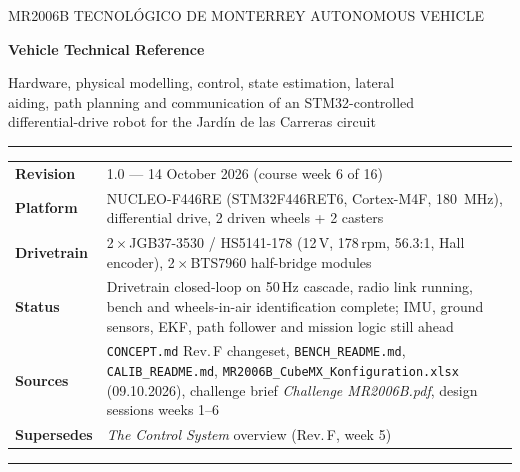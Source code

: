 \documentclass[11pt,a4paper]{article}
\newcommand{\code}[1]{\texttt{\small #1}}
\begin{document}
\begin{titlepage}
\vspace*{22mm}
{\footnotesize\ttfamily\color{accent}MR2006B \textperiodcentered{} TECNOL\'OGICO DE MONTERREY \textperiodcentered{} AUTONOMOUS VEHICLE\par}
\vspace{5mm}
{\fontsize{30}{36}\selectfont\bfseries\sffamily Vehicle Technical Reference\par}
\vspace{5mm}
{\large\color{grey}Hardware, physical modelling, control, state estimation, lateral\\
aiding, path planning and communication of an STM32-controlled\\
differential-drive robot for the Jard\'in de las Carreras circuit\par}
\vspace{14mm}
{\color{rule}\rule{\textwidth}{0.4pt}}
\vspace{2mm}

\begin{tabularx}{\textwidth}{@{}>{\bfseries\sffamily\small}lL@{}}
Revision     & 1.0 --- 14 October 2026 (course week 6 of 16)\\
Platform     & NUCLEO-F446RE (STM32F446RET6, Cortex-M4F, \qty{180}{\mega\hertz}),
               differential drive, 2 driven wheels + 2 casters\\
Drivetrain   & 2\,$\times$\,JGB37-3530 / HS5141-178 (12\,V, 178\,rpm, 56.3:1, Hall encoder),
               2\,$\times$\,BTS7960 half-bridge modules\\
Status       & Drivetrain closed-loop on 50\,Hz cascade, radio link running,
               bench and wheels-in-air identification complete; IMU, ground sensors,
               EKF, path follower and mission logic still ahead\\
Sources      & \code{CONCEPT.md} Rev.\,F changeset, \code{BENCH\_README.md},
               \code{CALIB\_README.md}, \code{MR2006B\_CubeMX\_Konfiguration.xlsx}
               (09.10.2026), challenge brief \emph{Challenge MR2006B.pdf},
               design sessions weeks 1--6\\
Supersedes   & \emph{The Control System} overview (Rev.\,F, week 5)\\
\end{tabularx}

\vspace{2mm}
{\color{rule}\rule{\textwidth}{0.4pt}}


\end{titlepage}
\end{document}

